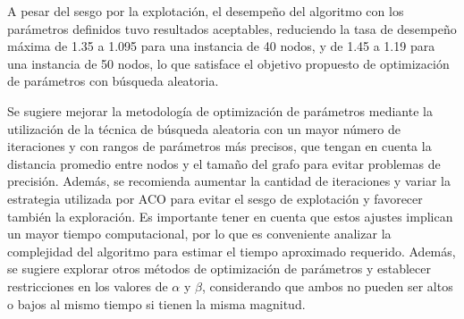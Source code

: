 \documentclass[conference]{IEEEtran}
\begin{document}
A pesar del sesgo por la explotación, el desempeño del algoritmo con los parámetros definidos tuvo resultados aceptables, reduciendo la tasa de desempeño máxima de 1.35 a 1.095 para una instancia de 40 nodos, y de 1.45 a 1.19 para una instancia de 50 nodos, lo que satisface el objetivo propuesto de optimización de parámetros con búsqueda aleatoria.

Se sugiere mejorar la metodología de optimización de parámetros mediante la utilización de la técnica de búsqueda aleatoria con un mayor número de iteraciones y con rangos de parámetros más precisos, que tengan en cuenta la distancia promedio entre nodos y el tamaño del grafo para evitar problemas de precisión. Además, se recomienda aumentar la cantidad de iteraciones y variar la estrategia utilizada por ACO para evitar el sesgo de explotación y favorecer también la exploración. Es importante tener en cuenta que estos ajustes implican un mayor tiempo computacional, por lo que es conveniente analizar la complejidad del algoritmo para estimar el tiempo aproximado requerido. Además, se sugiere explorar otros métodos de optimización de parámetros y establecer restricciones en los valores de $\alpha$ y $\beta$, considerando que ambos no pueden ser altos o bajos al mismo tiempo si tienen la misma magnitud.
\end{document}

